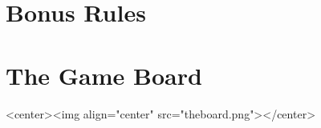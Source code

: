 \documentclass[12pt,a4paper]{article}
\begin{document}
\section{Bonus Rules}\label{bonus}
  

\cleardoublepage
\section{The Game Board}\label{board}
  \begin{rawhtml}
    <center><img align="center" src="theboard.png"></center>
  \end{rawhtml}

%
\end{document}
